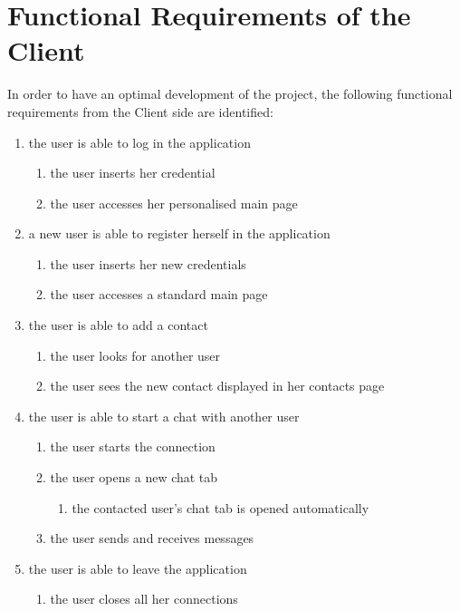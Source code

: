 \documentclass[finalReport.tex]{subfiles}
\begin{document}
\section{Functional Requirements of the Client} \label{sec:FRclient} 
In order to have an optimal development of the project, the following functional requirements from the Client side are identified:
\begin{enumerate}[label=(\alph*)]

\item the user is able to log in the application \label{item:login}
\begin{enumerate}[label=(\alph*)]
\item the user inserts her credential
\item the user accesses her personalised main page
\end{enumerate}

\item a new user is able to register herself in the application
\begin{enumerate}[label=(\alph*)]
\item the user inserts her new credentials
\item the user accesses a standard main page
\end{enumerate}

\item the user is able to add a contact
\begin{enumerate}[label=(\alph*)]
\item the user looks for another user
\item the user sees the new contact displayed in her contacts page
\end{enumerate}

\item the user is able to start a chat with another user
\begin{enumerate}[label=(\alph*)]
	\item the user starts the connection
	\item the user opens a new chat tab
\begin{enumerate}[label=(\alph*)]
		\item the contacted user's chat tab is opened automatically 
\end{enumerate}
	\item the user sends and receives messages
\end{enumerate}

\item the user is able to leave the application \label{item:logout}
\begin{enumerate}
\item the user closes all her connections
\end{enumerate}


\end{enumerate}
\end{document}
